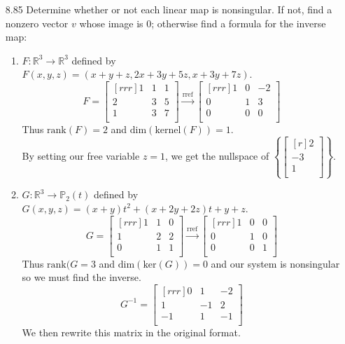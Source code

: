 \documentclass[12pt]{article}
\theoremstyle{definition}
\theoremstyle{plain}
\begin{document}
\begin{enumerate}
\item[8.85] Determine whether or not each linear map is nonsingular. If not, find a nonzero vector $v$ whose image is 0; otherwise find a formula for the inverse map:
	\begin{enumerate}
	\item $F:\mathbb{R}^3\rightarrow\mathbb{R}^3$ defined by $F(x,y,z)=(x+y+z,2x+3y+5z,x+3y+7z)$.\\
	\[ F = \begin{bmatrix}[rrr]1&1&1\\2&3&5\\1&3&7\\\end{bmatrix} \xrightarrow[]{\mathrm{rref}} \begin{bmatrix}[rrr]1&0&-2\\0&1&3\\0&0&0\\\end{bmatrix} \]
	Thus $\mathrm{rank}(F)=2$ and $\mathrm{dim}(\mathrm{kernel}(F))=1$.\\
	By setting our free variable $z=1$, we get the nullspace of $\left\{\begin{bmatrix}[r]2\\-3\\1\\\end{bmatrix}\right\}$.
	\item $G:\mathbb{R}^3\rightarrow\mathbb{P}_2(t)$ defined by $G(x,y,z)=(x+y)t^2+(x+2y+2z)t+y+z$.\\
	\[ G=\begin{bmatrix}[rrr]1&1&0\\1&2&2\\0&1&1\\\end{bmatrix} \xrightarrow[]{\mathrm{rref}} \begin{bmatrix}[rrr]1&0&0\\0&1&0\\0&0&1\\\end{bmatrix} \]
	Thus $\mathrm{rank}(G=3$ and $\mathrm{dim}(\mathrm{ker}(G))=0$ and our system is nonsingular so we must find the inverse.
	\[ G^{-1} = \begin{bmatrix}[rrr]0&1&-2\\1&-1&2\\-1&1&-1\\\end{bmatrix} \]
	We then rewrite this matrix in the original format.

\end{enumerate}
\end{enumerate}
\end{document}
